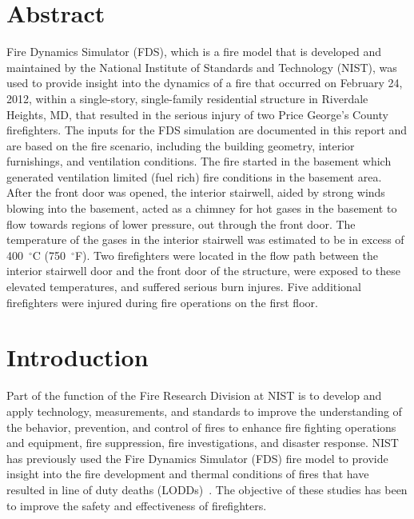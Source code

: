 \documentclass[12pt,oneside]{book}
\begin{document}
\chapter*{\centering Abstract}
Fire Dynamics Simulator (FDS), which is a fire model that is developed and maintained by the National Institute of Standards and Technology (NIST), was used to provide insight into the dynamics of a fire that occurred on February 24, 2012, within a single-story, single-family residential structure in Riverdale Heights, MD, that resulted in the serious injury of two Price George's County firefighters. The inputs for the FDS simulation are documented in this report and are based on the fire scenario, including the building geometry, interior furnishings, and ventilation conditions. The fire started in the basement which generated ventilation limited (fuel rich) fire conditions in the basement area. After the front door was opened, the interior stairwell, aided by strong winds blowing into the basement, acted as a chimney for hot gases in the basement to flow towards regions of lower pressure, out through the front door. The temperature of the gases in the interior stairwell was estimated to be in excess of 400~$^{\circ}$C (750~$^{\circ}$F). Two firefighters were located in the flow path between the interior stairwell door and the front door of the structure, were exposed to these elevated temperatures, and suffered serious burn injures. Five additional firefighters were injured during fire operations on the first floor.

\chapter{Introduction}
\setcounter{page}{1}
Part of the function of the Fire Research Division at NIST is to develop and apply technology, measurements, and standards to improve the understanding of the behavior, prevention, and control of fires to enhance fire fighting operations and equipment, fire suppression, fire investigations, and disaster response. NIST has previously used the Fire Dynamics Simulator (FDS) fire model to provide insight into the fire development and thermal conditions of fires that have resulted in line of duty deaths (LODDs)~\cite{Madrzykowski:1,Iowa,Texas,Bryner:Charleston,barowy:texas,Weinschenk:Chicago,Overholt:San_Francisco}. The objective of these studies has been to improve the safety and effectiveness of firefighters.
\end{document}
